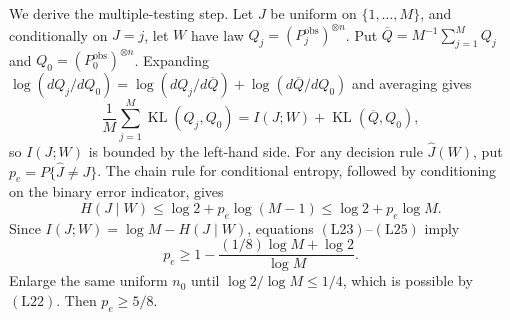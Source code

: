 We derive the multiple-testing step.  Let \(J\) be uniform on
\(\{1,\ldots,M\}\), and conditionally on \(J=j\), let \(W\) have law
\(Q_j=(P_j^{\mathrm{obs}})^{\otimes n}\).  Put
\(\overline Q=M^{-1}\sum_{j=1}^M Q_j\) and
\(Q_0=(P_0^{\mathrm{obs}})^{\otimes n}\).  Expanding
\(\log(dQ_j/dQ_0)=\log(dQ_j/d\overline Q)+
\log(d\overline Q/dQ_0)\) and averaging gives
\[
 \frac1M\sum_{j=1}^M\operatorname{KL}(Q_j,Q_0)
 =I(J;W)+\operatorname{KL}(\overline Q,Q_0),
 \tag{L24}
\]
so \(I(J;W)\) is bounded by the left-hand side.  For any decision rule
\(\widehat J(W)\), put \(p_e=P\{\widehat J\ne J\}\).  The chain rule for conditional entropy, followed by conditioning on the binary error indicator, gives
\[
 H(J\mid W)\leq\log2+p_e\log(M-1)
 \leq\log2+p_e\log M.
 \tag{L25}
\]
Since \(I(J;W)=\log M-H(J\mid W)\), equations
\((\mathrm{L23})\)--\((\mathrm{L25})\) imply
\[
 p_e\geq1-\frac{(1/8)\log M+\log2}{\log M}.
 \tag{L26}
\]
Enlarge the same uniform \(n_0\) until \(\log2/\log M\leq1/4\), which is possible by \((\mathrm{L22})\).  Then \(p_e\geq5/8\).

